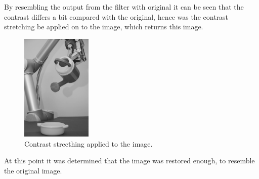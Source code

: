  By resembling the output from the filter with original it can be seen that the contrast differs a bit compared with the original,  hence was the contrast stretching be applied on to the image, which returns this image. 
 
 \begin{figure}[H]
 \centering
 \includegraphics[width=0.3\textwidth]{img4/filteredOutput_6509_contrast_strech.png}
 	\caption{Contrast strecthing applied to the image. }
    \label{fig:filter_become_ideal}
\end{figure} 

At this point it was determined that the image was restored enough, to resemble the original image. 

